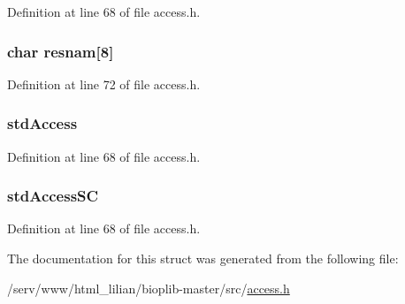 Definition at line 68 of file access.\-h.

\hypertarget{struct__resrad_a6f47476bfe0dd0abc0ade4a21127dfc2}{
\subsubsection[{resnam}]{\setlength{\rightskip}{0pt plus 5cm}char resnam\mbox{[}8\mbox{]}}}\label{struct__resrad_a6f47476bfe0dd0abc0ade4a21127dfc2}


Definition at line 72 of file access.\-h.

\hypertarget{struct__resrad_a623678b947bcd2ca2026cd3947bee48c}{
\subsubsection[{std\-Access}]{ std\-Access}}\label{struct__resrad_a623678b947bcd2ca2026cd3947bee48c}


Definition at line 68 of file access.\-h.

\hypertarget{struct__resrad_ac8bc9edea06d92057088a3a500b277d2}{
\subsubsection[{std\-Access\-S\-C}]{ std\-Access\-S\-C}}\label{struct__resrad_ac8bc9edea06d92057088a3a500b277d2}


Definition at line 68 of file access.\-h.



The documentation for this struct was generated from the following file\-:\begin{DoxyCompactItemize}
\item 
/serv/www/html\-\_\-lilian/bioplib-\/master/src/\hyperlink{access_8h}{access.\-h}\end{DoxyCompactItemize}
